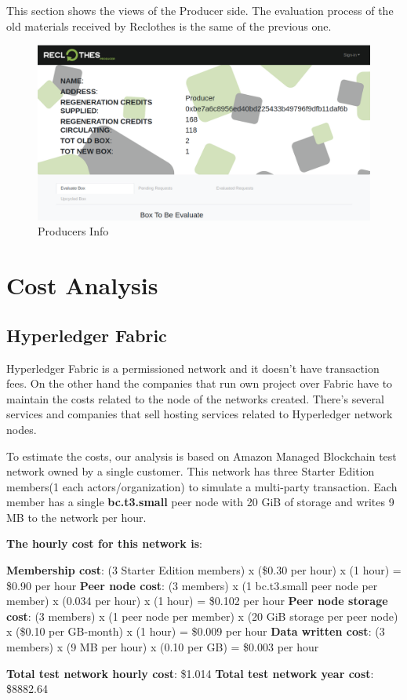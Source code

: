 This section shows the views of the Producer side. The evaluation process of the old materials
received by Reclothes is the same of the previous one.

\begin{figure}[h!]
    \centering
    \includegraphics[totalheight=7.5cm]{img/dapp/producer-info.png}
    \caption{Producers Info}
    \label{fig:producer-info}
\end{figure}


\section{Cost Analysis}

\subsection{Hyperledger Fabric}

Hyperledger Fabric is a permissioned network and it doesn't have transaction fees. On the other hand the
companies that run own project over Fabric have to maintain the costs related to the node of the networks
created. There's several services and companies that sell hosting services related to Hyperledger network
nodes. 
\bigskip

To estimate the costs, our analysis is based on Amazon Managed Blockchain\cite{aws} test network owned by a single 
customer. This network has three Starter Edition members(1 each actors/organization) to simulate a multi-party transaction. 
Each member has a single \textbf{bc.t3.small} peer node with 20 GiB of storage and writes 9 MB to the network 
per hour.

\begin{outline}
    \1 \textbf{The hourly cost for this network is}:

    \2 \textbf{Membership cost}: (3 Starter Edition members) x (\$0.30 per hour) x (1 hour) = \$0.90 per hour
    \2 \textbf{Peer node cost}: (3 members) x (1 bc.t3.small peer node per member) x (0.034 per hour) x (1 hour) = \$0.102 per hour
    \2 \textbf{Peer node storage cost}: (3 members) x (1 peer node per member) x (20 GiB storage per peer node) x (\$0.10 per GB-month) x (1 hour) = \$0.009 per hour
    \2 \textbf{Data written cost}: (3 members) x (9 MB per hour) x (0.10 per GB) = \$0.003 per hour

    \1 \textbf{Total test network hourly cost}: \$1.014
    \1 \textbf{Total test network year cost}: \$8882.64
\end{outline}


